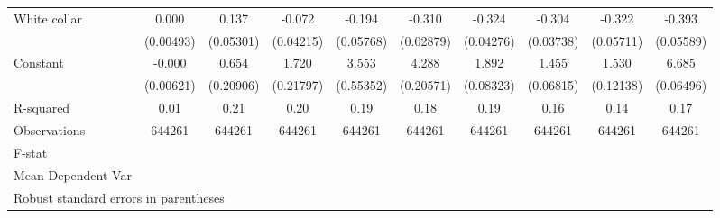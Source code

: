 {\begin{tabular}{l*{9}{c}}
White collar        &       0.000         &       0.137\sym{**} &      -0.072         &      -0.194\sym{***}&      -0.310\sym{***}&      -0.324\sym{***}&      -0.304\sym{***}&      -0.322\sym{***}&      -0.393\sym{***}\\
                    &   (0.00493)         &   (0.05301)         &   (0.04215)         &   (0.05768)         &   (0.02879)         &   (0.04276)         &   (0.03738)         &   (0.05711)         &   (0.05589)         \\
Constant            &      -0.000         &       0.654\sym{**} &       1.720\sym{***}&       3.553\sym{***}&       4.288\sym{***}&       1.892\sym{***}&       1.455\sym{***}&       1.530\sym{***}&       6.685\sym{***}\\
                    &   (0.00621)         &   (0.20906)         &   (0.21797)         &   (0.55352)         &   (0.20571)         &   (0.08323)         &   (0.06815)         &   (0.12138)         &   (0.06496)         \\
\hline
R-squared           &        0.01         &        0.21         &        0.20         &        0.19         &        0.18         &        0.19         &        0.16         &        0.14         &        0.17         \\
Observations        &      644261         &      644261         &      644261         &      644261         &      644261         &      644261         &      644261         &      644261         &      644261         \\
F-stat              &                     &                     &                     &                     &                     &                     &                     &                     &                     \\
Mean Dependent Var  &                     &                     &                     &                     &                     &                     &                     &                     &                     \\
\hline\hline
\multicolumn{10}{l}{\footnotesize Robust standard errors in parentheses}\\
\end{tabular}
}
